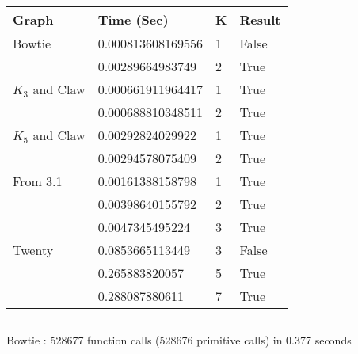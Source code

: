 \documentclass[11pt]{article}
\begin{document}
\subsection{}
\label{subsec:results} %
\begin{center}
\begin{tabu} to 0.9\textwidth { | X[l] X[l] X[c] X[c] | }
\hline
Graph & Time (Sec) & K & Result \\
[0.5ex]
\hline
\hline
Bowtie & 0.000813608169556 & 1 & False \\
[0.3ex]
  & 0.00289664983749 & 2 & True \\
[0.3ex]
\hline
$K_3$ and Claw & 0.000661911964417 & 1 & True \\
[0.3ex]
 & 0.000688810348511 & 2 & True \\
[0.3ex]
\hline
$K_5$ and Claw & 0.00292824029922 & 1 & True \\
[0.3ex]
 & 0.00294578075409 & 2 & True \\
[0.3ex]
\hline
From 3.1 & 0.00161388158798 & 1 & True \\
[0.3ex]
 & 0.00398640155792 & 2 & True \\
[0.3ex]
 & 0.0047345495224 & 3 & True \\
[0.3ex]
\hline
Twenty & 0.0853665113449 & 3 & False \\
[0.3ex]
  & 0.265883820057 & 5 & True \\
[0.3ex]
 & 0.288087880611 & 7 & True \\
[0.3ex]
\hline
\end{tabu}
\end{center}

\subsection{}
\label{subsec:results} %

Bowtie : 528677 function calls (528676 primitive calls) in 0.377 seconds
\end{document}
